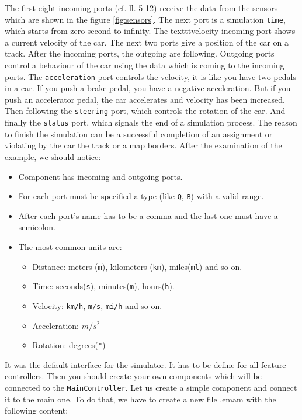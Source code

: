 \bigskip
The first eight incoming ports (cf. ll. 5-12) receive the data from the sensors which are shown in the figure \ref{fig:sensors}. The next port is a simulation \texttt{time}, which starts from zero second to infinity. The texttt{velocity} incoming port shows a current velocity of the car. The next two ports give a position of the car on a track. After the incoming ports, the outgoing are following. Outgoing ports control a behaviour of the car using the data which is coming to the incoming ports. The \texttt{acceleration} port controls the velocity, it is like you have two pedals in a car. If you push a brake pedal, you have a negative acceleration. But if you push an accelerator pedal, the car accelerates and velocity has been increased. Then following the \texttt{steering} port, which controls the rotation of the car. And finally the \texttt{status} port, which signals the end of a simulation process. The reason to finish the simulation can be a successful completion of an assignment or violating by the car the track or a map borders. \newline
After the examination of the example, we should notice:
\begin{itemize}
\item Component has incoming and outgoing ports.
\item For each port must be specified a type (like \texttt{Q}, \texttt{B}) with a valid range.
\item After each port's name has to be a comma and the last one must have a semicolon.
\item The most common units are:
    \begin{itemize}
        \item Distance: meters (\texttt{m}), kilometers (\texttt{km}), miles(\texttt{ml}) and so on.
        \item Time: seconds(\texttt{s}), minutes(\texttt{m}), hours(\texttt{h}).
        \item Velocity: \texttt{km/h}, \texttt{m/s}, \texttt{mi/h} and so on.
        \item Acceleration: $m/s^2$
        \item Rotation: degrees(\texttt{°})
    \end{itemize}
\end{itemize}
It was the default interface for the simulator. It has to be define for all feature controllers. Then you should create your own components which will be connected to the \texttt{MainController}. Let us create a simple component and connect it to the main one. To do that, we have to create a new file .emam with the following content:
